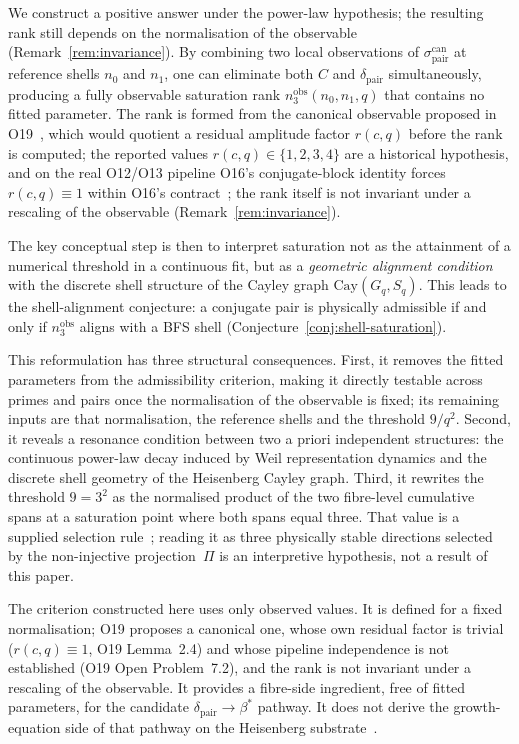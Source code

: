 \documentclass[11pt,a4paper]{article}
\theoremstyle{definition}
\theoremstyle{remark}
\begin{document}
  We construct a positive answer under the power-law
  hypothesis; the resulting rank still depends on the
  normalisation of the observable (Remark~\ref{rem:invariance}).
  By combining two local observations of
  $\sigma_{\mathrm{pair}}^{\mathrm{can}}$ at reference shells
  $n_0$ and $n_1$, one can eliminate both $C$ and
  $\delta_{\mathrm{pair}}$ simultaneously, producing a fully
  observable saturation rank $n_3^{\mathrm{obs}}(n_0, n_1, q)$
  that contains no fitted parameter.
  The rank is formed from the canonical observable proposed in
  O19~\cite{Beau2026a23}, which would quotient a residual amplitude factor
  $r(c,q)$ before the rank is computed; the reported values $r(c,q) \in \{1,2,3,4\}$ are a
  historical hypothesis, and on the real O12/O13 pipeline O16's conjugate-block identity
  forces $r(c,q) \equiv 1$ within O16's contract~\cite{Beau2026a20}; the rank itself is not invariant under a rescaling of
  the observable (Remark~\ref{rem:invariance}).

  The key conceptual step is then to interpret saturation not
  as the attainment of a numerical threshold in a continuous
  fit, but as a \emph{geometric alignment condition} with the
  discrete shell structure of the Cayley graph
  $\mathrm{Cay}(G_q, S_q)$.
  This leads to the shell-alignment conjecture: a conjugate
  pair is physically admissible if and only if
  $n_3^{\mathrm{obs}}$ aligns with a BFS shell
  (Conjecture~\ref{conj:shell-saturation}).

  This reformulation has three structural consequences.
  First, it removes the fitted parameters from the admissibility
  criterion, making it directly testable across primes and
  pairs once the normalisation of the observable is fixed; its
  remaining inputs are that normalisation, the reference shells and
  the threshold $9/q^2$.
  Second, it reveals a resonance condition between two a priori
  independent structures: the continuous power-law decay
  induced by Weil representation dynamics and the discrete
  shell geometry of the Heisenberg Cayley graph.
  Third, it rewrites the threshold $9 = 3^2$ as the normalised
  product of the two fibre-level cumulative spans at a saturation
  point where both spans equal three.
  That value is a supplied selection rule~\cite{Beau2026a28}; reading
  it as three physically stable directions selected by the
  non-injective projection~$\Pi$ is an interpretive hypothesis, not a
  result of this paper.

  The criterion constructed here uses only observed values.
  It is defined for a fixed normalisation; O19 proposes a canonical one, whose
  own residual factor is trivial ($r(c,q)\equiv1$, O19 Lemma~2.4) and whose pipeline independence is not established
  (O19 Open Problem~7.2), and the rank is not invariant under a rescaling of the
  observable.
  It provides a fibre-side ingredient, free of fitted parameters, for the
  candidate $\delta_{\mathrm{pair}} \to \beta^*$ pathway.
  It does not derive the growth-equation side of that pathway
  on the Heisenberg substrate~\cite{Beau2026sgn}.
\end{document}
